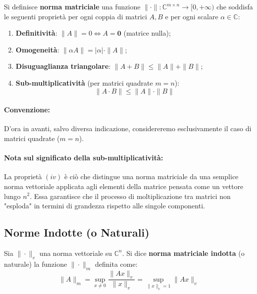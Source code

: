 \documentclass[a4paper,12pt]{article}
\begin{document}
	\begin{tcolorbox}[title=Definizione: Norma Matriciale]
		Si definisce \textbf{norma matriciale} una funzione $\|\cdot\| : \mathbb{C}^{m \times n} \longrightarrow [0, +\infty)$ che soddisfa le seguenti proprietà per ogni coppia di matrici $A, B$ e per ogni scalare $\alpha \in \mathbb{C}$:
		
		\begin{enumerate}
			\item[(i)] \textbf{Definitività}: $\|A\| = 0 \iff A = \mathbf{0}$ (matrice nulla);
			\item[(ii)] \textbf{Omogeneità}: $\|\alpha A\| = |\alpha| \cdot \|A\|$;
			\item[(iii)] \textbf{Disuguaglianza triangolare}: $\|A + B\| \le \|A\| + \|B\|$;
			\item[(iv)] \textbf{Sub-multiplicatività} (per matrici quadrate $m=n$):
			\begin{equation}
				\|A \cdot B\| \le \|A\| \cdot \|B\|
			\end{equation}
		\end{enumerate}
	\end{tcolorbox}
	
	\paragraph{Convenzione:}
	D'ora in avanti, salvo diversa indicazione, considereremo esclusivamente il caso di matrici quadrate ($m = n$).
	
	\vspace{0.5cm}
	
	\paragraph{Nota sul significato della sub-multiplicatività:}
	La proprietà $(iv)$ è ciò che distingue una norma matriciale da una semplice norma vettoriale applicata agli elementi della matrice pensata come un vettore lungo $n^2$. Essa garantisce che il processo di moltiplicazione tra matrici non "esploda" in termini di grandezza rispetto alle singole componenti.
	\subsection{Norme Indotte (o Naturali)}
	
	\begin{tcolorbox}[title=Definizione: Norma Indotta]
		Sia $\|\cdot\|_v$ una norma vettoriale su $\mathbb{C}^n$. Si dice \textbf{norma matriciale indotta} (o naturale) la funzione $\|\cdot\|_m$ definita come:
		\begin{equation}
			\|A\|_m = \sup_{x \neq 0} \frac{\|Ax\|_v}{\|x\|_v} = \sup_{\|x\|_v = 1} \|Ax\|_v
		\end{equation}
	\end{tcolorbox}
	
\end{document}

